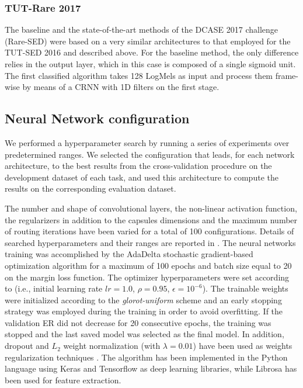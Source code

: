 \subsubsection{TUT-Rare 2017}
The baseline \cite{mesaros2016tut} and the state-of-the-art methods of the DCASE 2017 challenge (Rare-SED) were based on a very similar architectures to that employed for the TUT-SED 2016 and described above. For the baseline method, the only difference relies in the output layer, which in this case is composed of a single sigmoid unit.
The first classified algorithm \cite{limrare} takes 128 LogMels as input and process them frame-wise by means of a CRNN with 1D filters on the first stage.


\subsection{Neural Network configuration}

We performed a hyperparameter search by running a series of experiments over predetermined ranges. We selected the configuration that leads, for each network architecture, to the best results from the cross-validation procedure on the development dataset of each task, and used this architecture to compute the results on the corresponding evaluation dataset.

The number and shape of convolutional layers, the non-linear activation function, the regularizers in addition to the capsules dimensions and the maximum number of routing iterations have been varied for a total of 100 configurations. Details of searched hyperparameters and their ranges are reported in .
The neural networks training was accomplished by the AdaDelta stochastic gradient-based optimization algorithm \cite{zeiler2012adadelta} for a maximum of 100 epochs and batch size equal to 20 on the margin loss function. The optimizer hyperparameters were set according to \cite{zeiler2012adadelta} (i.e., initial learning rate $lr=1.0$, $\rho=0.95$, $\epsilon=10^{-6}$). %
The trainable weights were initialized according to the \textit{glorot-uniform} scheme \cite{glorot2010understanding} and an early stopping strategy was employed during the training in order to avoid overfitting. If the validation ER did not decrease for 20 consecutive epochs, the training was stopped and the last saved model was selected as the final model. In addition, dropout and $L_2$ weight normalization (with $\lambda=0.01$) have been used as weights regularization techniques \cite{srivastava2014dropout}. 
The algorithm has been implemented in the Python language using Keras \cite{chollet2015keras} and Tensorflow \cite{tensorflow2015-whitepaper} as deep learning libraries, while Librosa \cite{mcfee2015librosa} has been used for feature extraction.

